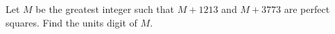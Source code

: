Let $M$ be the greatest integer such that $M+1213$ and $M+3773$ are perfect squares. Find the units digit of $M$.
